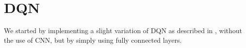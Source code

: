 \section{DQN}
We started by implementing a slight variation of DQN as described in \cite{dqn}, without the use of CNN, but by simply using fully connected layers.